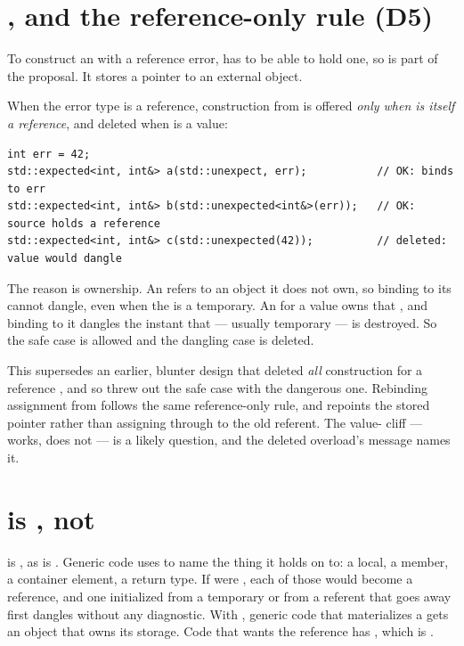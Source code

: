 \documentclass[a4paper,10pt,oneside,openany,final,article]{memoir}
\begin{document}
\section{, and the reference-only rule (D5)}

To construct an  with a reference error,  has
to be able to hold one, so  is part of the proposal. It
stores a pointer to an external object.

When the error type is a reference, construction from  is
offered \emph{only when  is itself a reference}, and deleted when
 is a value:

\begin{verbatim}
int err = 42;
std::expected<int, int&> a(std::unexpect, err);           // OK: binds to err
std::expected<int, int&> b(std::unexpected<int&>(err));   // OK: source holds a reference
std::expected<int, int&> c(std::unexpected(42));          // deleted: value would dangle
\end{verbatim}

The reason is ownership. An  refers to an object it does
not own, so binding  to its  cannot dangle, even when
the  is a temporary. An  for a value
 owns that , and binding  to it dangles the instant
that --- usually temporary ---  is destroyed. So the safe case
is allowed and the dangling case is deleted.

This supersedes an earlier, blunter design that deleted \emph{all}
 construction for a reference , and so threw out
the safe  case with the dangerous one. Rebinding
assignment from  follows the same reference-only rule,
and repoints the stored pointer rather than assigning through to the old
referent. The value- cliff ---  works,
 does not --- is a likely question, and the deleted
overload's message names it.

\section{ is , not }

 is , as
 is \cite{P2988R12}. Generic code uses
 to name the thing it holds on to: a local, a member, a
container element, a return type. If  were , each
of those would become a reference, and one initialized from a temporary or from
a referent that goes away first dangles without any diagnostic. With
, generic code that materializes a  gets an object
that owns its storage. Code that wants the reference has
, which is .
\end{document}
